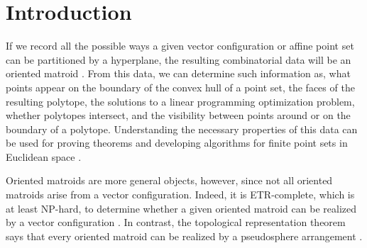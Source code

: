 \section{Introduction}

If we record all the possible ways a given vector configuration or affine point set can be partitioned by a hyperplane, the resulting combinatorial data will be an oriented matroid \cite{bjorner1999oriented}.
From this data, we can determine such information as, what points appear on the boundary of the convex hull of a point set, the faces of the resulting polytope, the solutions to a linear programming optimization problem, whether polytopes intersect, and the visibility between points around or on the boundary of a polytope.
Understanding the necessary properties of this data can be used for proving theorems and developing algorithms for finite point sets in Euclidean space \cite{oswin2013,cardinal2019subquadratic,DobHolHub2014Erdos,habert2012,knuth1992axioms,novick1,novick2,shnurnikov2016tk}.

Oriented matroids are more general objects, however, since not all oriented matroids arise from a vector configuration. Indeed, it is ETR-complete, which is at least NP-hard, to determine whether a given oriented matroid can be realized by a vector configuration \cite{shor1991stretchability}.
In contrast, the topological representation theorem says that every oriented matroid can be realized by a pseudosphere arrangement \cite{folkman1978oriented}.

